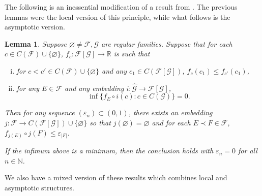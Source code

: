 \documentclass[12pt]{amsart}
\newtheorem{lemma}[theorem]{Lemma}
\theoremstyle{definition}
\newcommand{\rr}{\mathbb{R}}
\newcommand{\nn}{\mathbb{N}}
\newcommand{\fff}{\mathcal{F}}
\newcommand{\gggg}{\mathcal{G}}
\begin{document}
The following is an inessential modification of a result from \cite{Causey}.  The previous lemmas were the local version of this principle, while what follows is the asymptotic version.  



\begin{lemma} Suppose $\varnothing \neq \fff, \gggg$ are regular families.  Suppose that for each $c\in  C(\fff)\cup \{\varnothing\}$, $f_c:\fff[\gggg]\to \rr$ is such that \begin{enumerate}[(i)]\item for $c<c'\in C(\fff)\cup \{\varnothing\}$ and any $c_1\in C(\fff[\gggg])$, $f_c(c_1)\leqslant f_{c'}(c_1)$, \item for any $E\in \fff$ and any embedding $i:\widehat{\gggg}\to \fff[\gggg]$, $$\inf\{f_E\circ i(c): c\in C(\gggg)\}=0.$$  \end{enumerate} Then for any sequence $(\varepsilon_n)\subset (0,1)$, there exists an embedding $j:\fff\to C(\fff[\gggg])\cup\{\varnothing\}$ so that $j(\varnothing)=\varnothing$ and for each $ E\prec F\in \fff$, $f_{ j(E)}\circ j(F)\leqslant \varepsilon_{|F|}$.  

If the infimum above is a minimum, then the conclusion holds with $\varepsilon_n=0$ for all $n\in \nn$.  

\label{asymptotic coloring}
\end{lemma}



We also have a mixed version of these results which combines local and asymptotic structures.   
\end{document}
